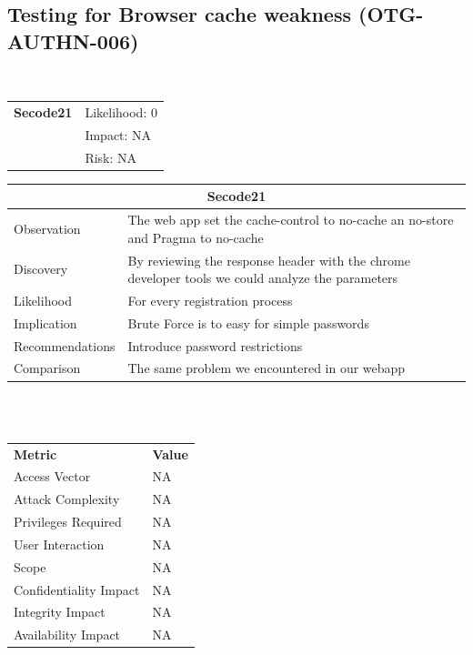 \documentclass[headsepline,footsepline,footinclude=false,oneside,fontsize=11pt,paper=a4,listof=totoc,bibliography=totoc]{scrbook} %
\begin{document}
\pagebreak
\subsection{Testing for Browser cache weakness (OTG-AUTHN-006)}\

\begin{tabular}{cR{12cm}}
	\textbf{Secode21} & Likelihood: 0\\& Impact: NA\\& Risk: NA
\end{tabular}

\begin{tabular}{ l|p{11cm}  }
	\hline
	\multicolumn{2}{c}{\textbf{Secode21}} \\
	\hline
	Observation & The web app set the cache-control to no-cache an no-store and Pragma to no-cache\\
	Discovery & By reviewing the response header with the chrome developer tools we could
	analyze the parameters\\
	Likelihood & For every registration process\\
	Implication & Brute Force is to easy for simple passwords\\
	Recommendations & Introduce password restrictions\\
	Comparison & The same problem we encountered in our webapp \\
	\hline
\end{tabular}
\\
\vspace{0.5cm}
\\
\begin{center}
	\begin{tabular}{ll}
		\rowcolor[HTML]{34CDF9}
		{\color[HTML]{ECF4FF} \textbf{Metric}}        & {\color[HTML]{ECF4FF} \textbf{Value}} \\
		\rowcolor[HTML]{BBDAFF}
		{\color[HTML]{333333} Access Vector}          & {\color[HTML]{333333} } NA              \\
		\rowcolor[HTML]{ECF4FF}
		{\color[HTML]{333333} Attack Complexity}      & {\color[HTML]{333333} } NA              \\
		\rowcolor[HTML]{BBDAFF}
		{\color[HTML]{333333} Privileges Required}    & {\color[HTML]{333333} } NA              \\
		\rowcolor[HTML]{ECF4FF}
		{\color[HTML]{333333} User Interaction}       & {\color[HTML]{333333} } NA              \\
		\rowcolor[HTML]{BBDAFF}
		{\color[HTML]{333333} Scope}                  & {\color[HTML]{333333} } NA              \\
		\rowcolor[HTML]{ECF4FF}
		{\color[HTML]{333333} Confidentiality Impact} & {\color[HTML]{333333} } NA              \\
		\rowcolor[HTML]{BBDAFF}
		{\color[HTML]{333333} Integrity Impact}       & {\color[HTML]{333333} } NA              \\
		\rowcolor[HTML]{ECF4FF}
		{\color[HTML]{333333} Availability Impact}    & {\color[HTML]{333333} } NA
	\end{tabular}
\end{center}
\end{document}
